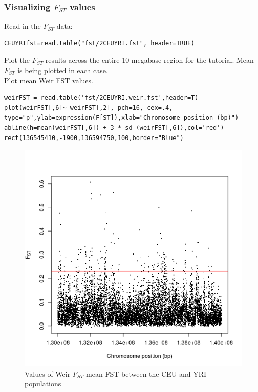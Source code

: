 \documentclass[a4paper,10pt]{article}
\begin{document}
\subsubsection{Visualizing $F_{ST}$ values}

\noindent
Read in the $F_{ST}$ data:\\
\begin{verbatim}
CEUYRIfst=read.table("fst/2CEUYRI.fst", header=TRUE)
\end{verbatim}

\noindent
Plot the $F_{ST}$ results across the entire 10 megabase region for the tutorial.  Mean $F_{ST}$ is being plotted in each case.\\

\noindent
Plot mean Weir FST values.\\
\begin{verbatim}
weirFST = read.table('fst/2CEUYRI.weir.fst',header=T) 
plot(weirFST[,6]~ weirFST[,2], pch=16, cex=.4, type="p",ylab=expression(F[ST]),xlab="Chromosome position (bp)") 
abline(h=mean(weirFST[,6]) + 3 * sd (weirFST[,6]),col='red')
rect(136545410,-1900,136594750,100,border="Blue") 
\end{verbatim}

\begin{figure}
\centering
\includegraphics{pictures/WeirCEUYRI.png}
\caption{Values of Weir $F_{ST}$ mean FST between the CEU and YRI populations}
\label{fig:a}
\end{figure}
\end{document}
